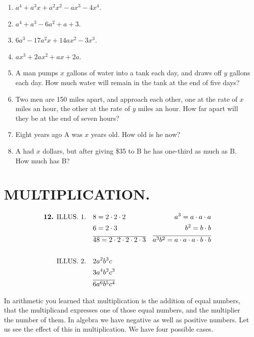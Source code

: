 \documentclass{book}
\begin{document}
\begin{enumerate}
\item $a^4 + a^3x + a^2x^2 - ax^3- 4x^4$.

\item $a^4 + a^3-6a^2+a + 3$.

\item $6a^3 - 17 a^2x + 14 ax^2 - 3x^3$.

\item $ax^3 + 2ax^2 + ax + 2a$.

\item A man pumps $x$ gallons of water into a tank each day, and
draws off $y$ gallons each day. How much water will remain in the
tank at the end of five days?

\item Two men are 150 miles apart, and approach each other, one at
the rate of $x$ miles an hour, the other at the rate of $y$ miles
an hour. How far apart will they be at the end of seven hours?

\item Eight years ago A was $x$ years old. How old is he now?

\item A had $x$ dollars, but after giving \$35 to B he has
one-third as much as B. How much has B?
\end{enumerate}

\section*{MULTIPLICATION.}

\begin{align*}
\textrm{\textbf{12.} ILLUS. } 1.\quad &  8=2 \cdot 2 \cdot 2 & a^3 = a \cdot a \cdot a\\
& 6= 2 \cdot 3 & b^2 = b \cdot b \\
&\overline{48 = 2 \cdot 2 \cdot 2 \cdot 2 \cdot 3} &
\overline{a^3b^2 = a \cdot a \cdot a \cdot b \cdot b}\\
\\
\textrm{ILLUS. } 2.\quad & 2 a^2b^3c\\
& 3a^4b^2c^3\\
&\overline{6a^6b^5c^4}
\end{align*}

In arithmetic you learned that multiplication is the addition of
equal numbers, that the multiplicand expresses one of those equal
numbers, and the multiplier the number of them. In algebra we have
negative as well as positive numbers. Let us see the effect of
this in multiplication. We have four possible cases.
\end{document}
